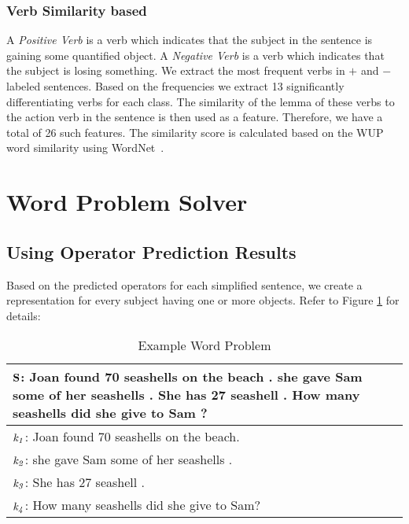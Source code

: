 \documentclass[11pt]{article}
\begin{document}
\subsubsection{Verb Similarity based}
A \textit{Positive Verb} is a verb which indicates that the subject in the sentence is gaining some quantified object. A \textit{Negative Verb} is a verb which indicates that the subject is losing something. We extract the most frequent verbs in  $\mathit{+}$ and $\mathit{-}$ labeled sentences. Based on the frequencies we extract 13 significantly differentiating verbs for each class. The similarity of the lemma of these verbs to the action verb in the sentence is then used as a feature. Therefore, we have a total of 26 such features. The similarity score is calculated based on the WUP word similarity using WordNet~\cite{WordNet:95}.

\section{Word Problem Solver}
\subsection{Using Operator Prediction Results}
Based on the predicted operators for each simplified sentence, we create a representation for every subject having one or more objects. Refer to Figure \ref{figure:11} for details:

\begin{table}[h!]
\centering
\begin{tabular}{ | m{7cm} | }
\hline
 $\mathbf{\small S}$\textbf{\small : Joan found 70 seashells on the beach . she gave Sam some of her seashells . She has 27 seashell . How many seashells did she give to Sam ?}\\
\hline
$\mathit{\small k_{1}}$\small : Joan found 70 seashells on the beach.\\
\hline
$\mathit{\small k_{2}}$\small : she gave Sam some of her seashells .\\
\hline
$\mathit{\small k_{3}}$\small : She has 27 seashell .\\
\hline
$\mathit{\small k_{4}}$\small : How many seashells did she give to Sam?\\
\hline
\end{tabular}
\caption{Example Word Problem}
\label{figure:11}
\end{table}
\end{document}
